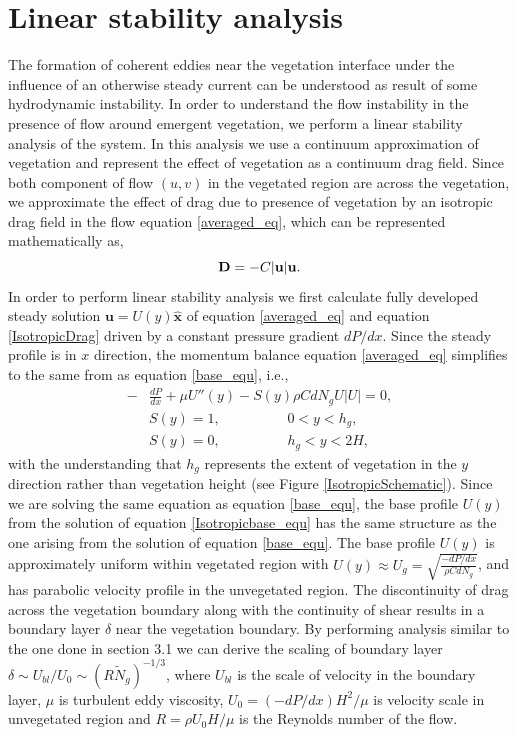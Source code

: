 \documentclass[12pt]{report}   %
\newcommand{\bx}{{\boldsymbol{\hat{x}}}}
\newcommand{\bu}{\mathbf{u}}
\newcommand{\hg}{h_g}
\newcommand{\Ndg}{\tilde{N}_g}
\begin{document}
\section{Linear stability analysis}
The formation of coherent eddies near the vegetation interface under the influence of an otherwise steady current can be understood as result of some hydrodynamic instability. In order to understand the flow instability in the presence of flow around emergent vegetation, we perform a linear stability analysis of the system. In this analysis we use a continuum approximation of vegetation and represent the effect of vegetation as a continuum drag field. 
Since both component of flow $(u,v)$ in the vegetated region are across the vegetation, we approximate the effect of drag due to presence of vegetation by an isotropic drag field in the flow equation \eqref{averaged_eq}, which can be represented mathematically as,
\begin{equation}
 {\bf{D}} = -C|\bu|\bu.
 \label{IsotropicDrag}
\end{equation}
In order to perform linear stability analysis we first calculate fully developed steady solution $\bu = U(y) \bx$ of equation \eqref{averaged_eq} and equation \eqref{IsotropicDrag} driven by a constant pressure gradient $dP/dx$. Since the steady profile is in $x$ direction, the momentum balance equation \eqref{averaged_eq}
simplifies to the same from as equation \eqref{base_equ}, i.e.,
\begin{equation}
\begin{split}
 -&\frac{dP}{dx}+\mu U''(y) -S(y) \rho C d N_gU |U| =0,\\
 &S(y) = 1, \hspace{2cm} 0<y<\hg,\\
 &S(y) = 0, \hspace{2cm} \hg< y< 2H,
\label{Isotropicbase_equ}
\end{split}
\end{equation}
with the understanding that $h_g$ represents the extent of vegetation in the $y$ direction rather than vegetation height (see Figure \ref{IsotropicSchematic}). Since we are solving the same equation as equation \eqref{base_equ}, the base profile $U(y)$ from the solution of equation \eqref{Isotropicbase_equ} has the same structure as the one arising from the solution of equation \eqref{base_equ}. The base profile $U(y)$ is approximately uniform within vegetated region with 
$U(y) \approx U_g = \sqrt{\frac{-dP/dx}{\rho C d N_g}}$, and has parabolic velocity profile in the unvegetated region. The discontinuity of drag across the vegetation boundary along with the continuity of shear results in a boundary layer $\delta$ near the vegetation boundary. By performing analysis similar to the one done in section 3.1 we can derive the scaling of boundary layer $\delta \sim U_{bl}/U_0 \sim (R\Ndg)^{-1/3}$, where $U_{bl}$ is the scale of velocity in the boundary layer, $\mu$ is turbulent eddy viscosity, $U_0 = (-dP/dx)H^2/\mu$ is velocity scale in unvegetated region and $R = \rho U_0 H/\mu$ is the Reynolds number of the flow.
\end{document}
